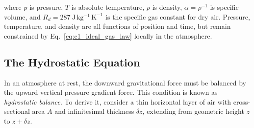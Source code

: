 \documentclass[10pt,twocolumn]{memoir}
\begin{document}
where $p$ is pressure, $T$ is absolute temperature, $\rho$ is density, $\alpha=\rho^{-1}$ is specific volume, and $R_d=287\ \mathrm{J\,kg^{-1}\,K^{-1}}$ is the specific gas constant for dry air. Pressure, temperature, and density are all functions of position and time, but remain constrained by Eq.~\ref{eq:c1_ideal_gas_law} locally in the atmosphere.

\subsection{The Hydrostatic Equation}

In an atmosphere at rest, the downward gravitational force must be balanced by the upward vertical pressure gradient force. This condition is known as \textit{hydrostatic balance}. To derive it, consider a thin horizontal layer of air with cross-sectional area $A$ and infinitesimal thickness $\delta z$, extending from geometric height $z$ to $z+\delta z$.
\end{document}
